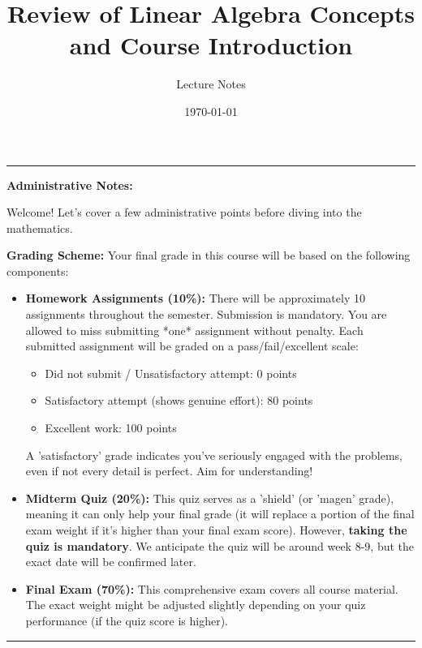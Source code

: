 \documentclass[11pt]{article}
\title{Review of Linear Algebra Concepts and Course Introduction}
\author{Lecture Notes} %
\date{\today} %
\theoremstyle{definition}
\theoremstyle{remark}
\newenvironment{adminnote}{%
  \par\medskip\noindent\rule{\linewidth}{0.4pt}\par\nobreak\medskip%
  \noindent\textbf{Administrative Notes:}\par\nobreak\smallskip%
}
{%
  \par\medskip\noindent\rule{\linewidth}{0.4pt}\par\nobreak\medskip%
}
\begin{document}
\maketitle

\begin{adminnote}
Welcome! Let's cover a few administrative points before diving into the mathematics.

\textbf{Grading Scheme:} Your final grade in this course will be based on the following components:
\begin{itemize}
    \item \textbf{Homework Assignments (10\%):} There will be approximately 10 assignments throughout the semester. Submission is mandatory. You are allowed to miss submitting *one* assignment without penalty. Each submitted assignment will be graded on a pass/fail/excellent scale:
        \begin{itemize}
            \item Did not submit / Unsatisfactory attempt: 0 points
            \item Satisfactory attempt (shows genuine effort): 80 points
            \item Excellent work: 100 points
        \end{itemize}
        A 'satisfactory' grade indicates you've seriously engaged with the problems, even if not every detail is perfect. Aim for understanding!
    \item \textbf{Midterm Quiz (20\%):} This quiz serves as a 'shield' (or 'magen' grade), meaning it can only help your final grade (it will replace a portion of the final exam weight if it's higher than your final exam score). However, \textbf{taking the quiz is mandatory}. We anticipate the quiz will be around week 8-9, but the exact date will be confirmed later.
    \item \textbf{Final Exam (70\%):} This comprehensive exam covers all course material. The exact weight might be adjusted slightly depending on your quiz performance (if the quiz score is higher).
\end{itemize}


\end{adminnote}
\end{document}
